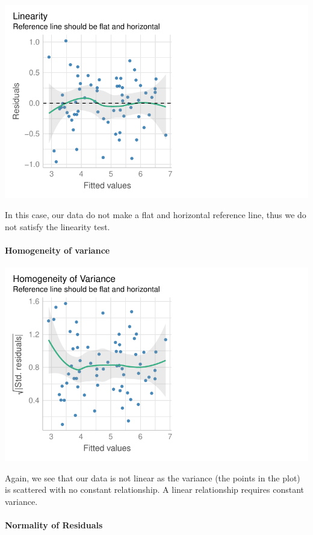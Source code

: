 \documentclass[
  letterpaper,
  DIV=11,
  numbers=noendperiod]{scrartcl}
\let\oldparagraph\paragraph
\renewcommand{\paragraph}[1]{\oldparagraph{#1}\mbox{}}
\begin{document}
\includegraphics{sds-291_s-24_case-study-template_files/figure-pdf/unnamed-chunk-7-1.pdf}

In this case, our data do not make a flat and horizontal reference line,
thus we do not satisfy the linearity test.

\hypertarget{homogeneity-of-variance}{%
\paragraph{Homogeneity of variance}\label{homogeneity-of-variance}}

\includegraphics{sds-291_s-24_case-study-template_files/figure-pdf/unnamed-chunk-8-1.pdf}

Again, we see that our data is not linear as the variance (the points in
the plot) is scattered with no constant relationship. A linear
relationship requires constant variance.

\hypertarget{normality-of-residuals}{%
\paragraph{Normality of Residuals}\label{normality-of-residuals}}
\end{document}
